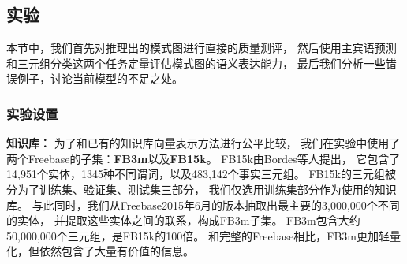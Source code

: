 
\subsection{实验}
\label{sec:schema-eval}

本节中，我们首先对推理出的模式图进行直接的质量测评，
然后使用主宾语预测和三元组分类这两个任务定量评估模式图的语义表达能力，
最后我们分析一些错误例子，讨论当前模型的不足之处。

\subsubsection{实验设置}

\textbf{知识库：}
为了和已有的知识库向量表示方法进行公平比较，
我们在实验中使用了两个Freebase的子集：{\bf FB3m}以及{\bf FB15k}。
FB15k由Bordes等人提出\cite{bordes2013translating}，
它包含了14,951个实体，1345种不同谓词，以及483,142个事实三元组。
FB15k的三元组被分为了训练集、验证集、测试集三部分，
我们仅选用训练集部分作为使用的知识库。
与此同时，我们从Freebase2015年6月的版本抽取出最主要的3,000,000个不同的实体，
并提取这些实体之间的联系，构成FB3m子集。
FB3m包含大约50,000,000个三元组，是FB15k的100倍。
和完整的Freebase相比，FB3m更加轻量化，但依然包含了大量有价值的信息。


